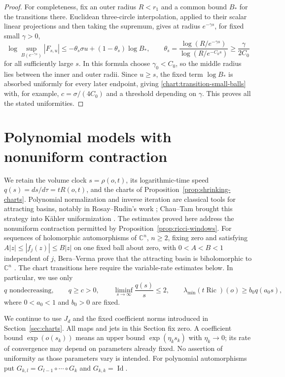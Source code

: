 \documentclass[11pt]{article}
\theoremstyle{definition}
\theoremstyle{remark}
\newcommand{\C}{\mathbb C}
\DeclareMathOperator{\Ric}{Ric}
\DeclareMathOperator{\Id}{Id}
\numberwithin{equation}{section}
\begin{document}
\begin{proof}
For completeness, fix an outer radius $R<r_1$ and a common
bound $B_*$ for the transitions there.  Euclidean
three-circle interpolation, applied to their scalar linear
projections and then taking the supremum, gives at radius
$e^{-\gamma s}$, for fixed small $\gamma>0$,
\[
 \log\sup_{B(e^{-\gamma s})}|F_{s,u}|
 \le-\theta_s\sigma u+(1-\theta_s)\log B_*,
 \qquad
 \theta_s=\frac{\log(R/e^{-\gamma s})}
                 {\log(R/e^{-C_0s})}
 \ge\frac{\gamma}{2C_0}
\]
for all sufficiently large $s$.  In this formula choose
$\gamma_0<C_0$, so the middle radius lies between the
inner and outer radii.  Since $u\ge s$, the fixed term
$\log B_*$ is absorbed uniformly for every later endpoint,
giving \eqref{chart:transition-small-balls} with, for
example, $c=\sigma/(4C_0)$ and a threshold depending on
$\gamma$.  This proves all the stated uniformities.
\end{proof}

\section{Polynomial models with nonuniform contraction}
\label{sec:dynamics}

We retain the volume clock $s=\rho(o,t)$, its logarithmic-time speed
$q(s)=ds/d\tau=tR(o,t)$, and the charts of
Proposition~\ref{prop:shrinking-charts}.
Polynomial normalization and inverse iteration are classical tools
for attracting basins, notably in Rosay--Rudin's work
\cite[Appendix]{RosayRudin1988}; Chau--Tam brought this strategy into
K\"ahler uniformization \cite{ChauTamComplex2006,ChauTamStein,ChauTamSimply}.
The estimates proved here address the nonuniform contraction permitted
by Proposition~\ref{prop:ricci-windows}.  For sequences of holomorphic
automorphisms of $\C^n$, $n\ge2$, fixing zero and satisfying
$A|z|\le|f_j(z)|\le B|z|$ on one fixed ball about zero, with
$0<A<B<1$ independent of $j$, Bera--Verma prove that the attracting
basin is biholomorphic to $\C^n$ \cite[Theorem~1.1]{BeraVerma2024}.
The chart transitions here require the variable-rate estimates below.
In particular, we use only
\begin{equation}
 q\text{ nondecreasing},\qquad q\ge c>0,\qquad
 \liminf_{s\to\infty}\frac{q(s)}s\le2,\qquad
 \lambda_{\min}(t\Ric)(o)\ge b_0q(a_0s),
 \label{eq:dyn:rate-input}
\end{equation}
where $0<a_0<1$ and $b_0>0$ are fixed.

We continue to use $J_d$ and the fixed coefficient norms introduced in
Section~\ref{sec:charts}.
All maps and jets in this Section fix zero.  A coefficient bound
$\exp(o(s_k))$ means an upper bound $\exp(\eta_k s_k)$ with
$\eta_k\to0$; its rate of convergence may depend on parameters already
fixed.  No assertion of uniformity as those parameters vary is intended.
For polynomial automorphisms put
$G_{k,l}=G_{l-1}\circ\cdots\circ G_k$ and $G_{k,k}=\Id$.
\end{document}
